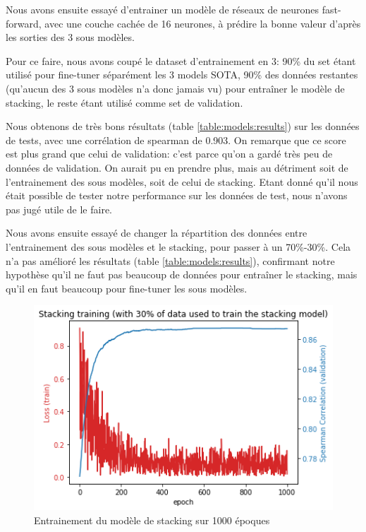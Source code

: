 \documentclass[11pt,a4paper, french]{article}
\begin{document}
Nous avons ensuite essayé d'entrainer un modèle de réseaux de neurones fast-forward, avec une couche cachée de 16 neurones, à prédire la bonne valeur d'après les sorties des 3 sous modèles.

Pour ce faire, nous avons coupé le dataset d'entrainement en 3: 90\% du set étant utilisé pour fine-tuner séparément les 3 models SOTA, 90\% des données restantes (qu'aucun des 3 sous modèles n'a donc jamais vu) pour entraîner le modèle de stacking, le reste étant utilisé comme set de validation.

Nous obtenons de très bons résultats (table \ref{table:models:results}) sur les données de tests, avec une corrélation de spearman de 0.903. On remarque que ce score est plus grand que celui de validation: c'est parce qu'on a gardé très peu de données de validation. On aurait pu en prendre plus, mais au détriment soit de l'entrainement des sous modèles, soit de celui de stacking. Etant donné qu'il nous était possible de tester notre performance sur les données de test, nous n'avons pas jugé utile de le faire.

Nous avons ensuite essayé de changer la répartition des données entre l'entrainement des sous modèles et le stacking, pour passer à un 70\%-30\%. Cela n'a pas amélioré les résultats (table \ref{table:models:results}), confirmant notre hypothèse qu'il ne faut pas beaucoup de données pour entraîner le stacking, mais qu'il en faut beaucoup pour fine-tuner les sous modèles.

\begin{figure}
  \includegraphics[width=\linewidth]{resources/stack-30-training.png}
  \caption{Entrainement du modèle de stacking sur 1000 époques}
  \label{fig:stack:train}
\end{figure}
\end{document}
